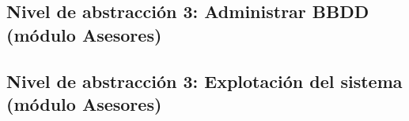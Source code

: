 \subsection{Nivel de abstracción 3: Administrar BBDD (módulo Asesores)}



\subsection{Nivel de abstracción 3: Explotación del sistema (\-mó\-dulo Asesores)}

